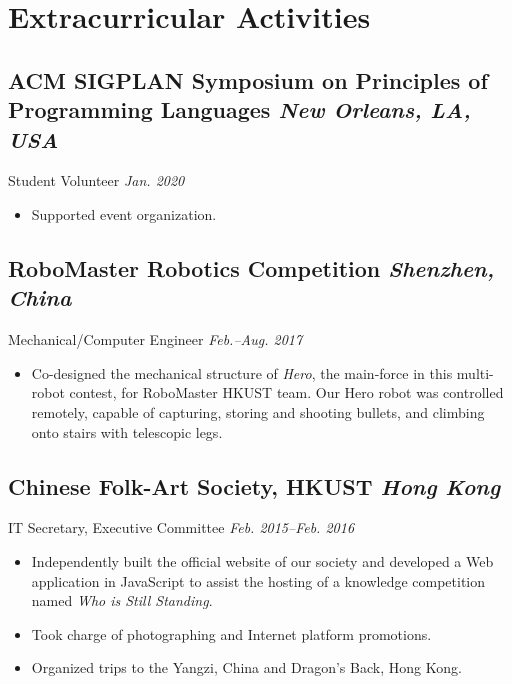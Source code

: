 \documentclass[11pt]{article}
\newcommand{\subsec}[2]{\subsection*{#1 \hfill {\normalfont\itshape #2}}}
\newcommand{\subsecdesc}[2]{{#1 \hfill \itshape #2}}
\begin{document}
\section*{Extracurricular Activities} %

  \subsec{ACM SIGPLAN Symposium on Principles of Programming Languages}
         {New Orleans, LA, USA}
  \subsecdesc{Student Volunteer}
             {Jan. 2020}
  \begin{itemize}
    \item Supported event organization.
  \end{itemize}

  \subsec{RoboMaster Robotics Competition}
         {Shenzhen, China}
  \subsecdesc{Mechanical/Computer Engineer}
             {Feb.--Aug. 2017}
  \begin{itemize}
    \item Co-designed the mechanical structure of \emph{Hero}, the main-force in
      this multi-robot contest, for RoboMaster HKUST team. Our Hero robot was
      controlled remotely, capable of capturing, storing and shooting bullets,
      and climbing onto stairs with telescopic legs.
  \end{itemize}

  \subsec{Chinese Folk-Art Society, HKUST}
         {Hong Kong}
  \subsecdesc{IT Secretary, Executive Committee}
             {Feb. 2015--Feb. 2016}
  \begin{itemize}
    \item Independently built the official website of our society and developed
      a Web application in JavaScript to assist the hosting of a knowledge
      competition named \emph{Who is Still Standing}.
    \item Took charge of photographing and Internet platform promotions.
    \item Organized trips to the Yangzi, China and Dragon's Back, Hong Kong.
  \end{itemize}
\end{document}
